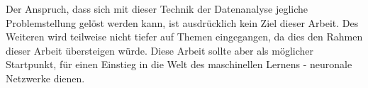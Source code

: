 \noindent
Der Anspruch, dass sich mit dieser Technik der Datenanalyse jegliche Problemstellung gelöst werden kann, ist ausdrücklich kein Ziel dieser Arbeit. 
Des Weiteren wird teilweise nicht tiefer auf Themen eingegangen, da dies den Rahmen dieser Arbeit übersteigen würde. 
Diese Arbeit sollte aber als möglicher Startpunkt, für einen Einstieg in die Welt des maschinellen Lernens - neuronale Netzwerke dienen. 






